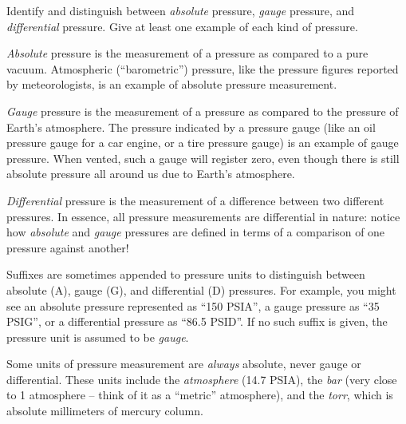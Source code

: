 

Identify and distinguish between {\it absolute} pressure, {\it gauge} pressure, and {\it differential} pressure.  Give at least one example of each kind of pressure.







{\it Absolute} pressure is the measurement of a pressure as compared to a pure vacuum.  Atmospheric (``barometric'') pressure, like the pressure figures reported by meteorologists, is an example of absolute pressure measurement.

{\it Gauge} pressure is the measurement of a pressure as compared to the pressure of Earth's atmosphere.  The pressure indicated by a pressure gauge (like an oil pressure gauge for a car engine, or a tire pressure gauge) is an example of gauge pressure.  When vented, such a gauge will register zero, even though there is still absolute pressure all around us due to Earth's atmosphere.

{\it Differential} pressure is the measurement of a difference between two different pressures.  In essence, all pressure measurements are differential in nature: notice how {\it absolute} and {\it gauge} pressures are defined in terms of a comparison of one pressure against another!

Suffixes are sometimes appended to pressure units to distinguish between absolute (A), gauge (G), and differential (D) pressures.  For example, you might see an absolute pressure represented as ``150 PSIA'', a gauge pressure as ``35 PSIG'', or a differential pressure as ``86.5 PSID''.  If no such suffix is given, the pressure unit is assumed to be {\it gauge}.

Some units of pressure measurement are {\it always} absolute, never gauge or differential.  These units include the {\it atmosphere} (14.7 PSIA), the {\it bar} (very close to 1 atmosphere -- think of it as a ``metric'' atmosphere), and the {\it torr}, which is absolute millimeters of mercury column.











